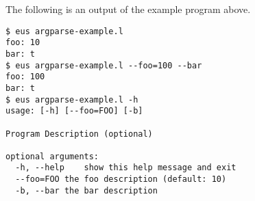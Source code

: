 \begin{refdesc}
The following is an output of the example program above.

\begin{verbatim}
$ eus argparse-example.l
foo: 10
bar: t
$ eus argparse-example.l --foo=100 --bar
foo: 100
bar: t
$ eus argparse-example.l -h
usage: [-h] [--foo=FOO] [-b]

Program Description (optional)

optional arguments:
  -h, --help	show this help message and exit
  --foo=FOO	the foo description (default: 10)
  -b, --bar	the bar description
\end{verbatim}

\end{refdesc}
